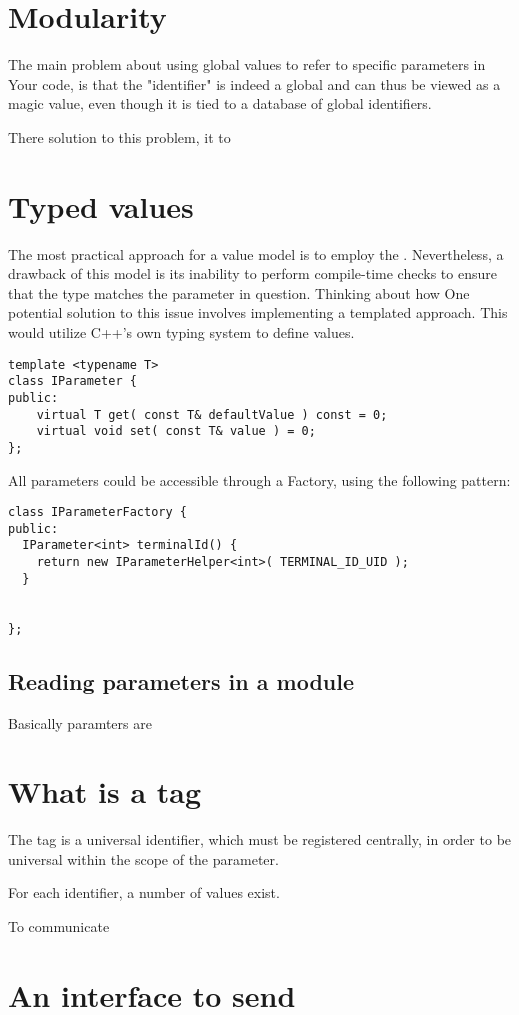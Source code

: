 \documentclass[a4paper,12pt]{article}
\begin{document}
\section{Modularity}
The main problem about using global values to refer to specific parameters in Your code, is that the "identifier" is indeed a global
and can thus be viewed as a magic value, even though it is tied to a database of global identifiers.

There solution to this problem, it to 

\section{Typed values}

The most practical approach for a value model is to employ the . 
Nevertheless, a drawback of this model is its inability to perform compile-time checks to ensure that the type matches the parameter in question. 
Thinking about how
One potential solution to this issue involves implementing a templated approach. This would utilize C++'s own typing system to define values. 

\begin{verbatim}
template <typename T>
class IParameter {
public:
    virtual T get( const T& defaultValue ) const = 0;
    virtual void set( const T& value ) = 0;
};
\end{verbatim}

All parameters could be accessible through a Factory, using the following pattern:

\begin{verbatim}
class IParameterFactory {
public:
  IParameter<int> terminalId() {
    return new IParameterHelper<int>( TERMINAL_ID_UID );
  }

  
};
\end{verbatim}


\subsection{Reading parameters in a module}
Basically paramters are 


\section{What is a tag}

The tag is a universal identifier, which must be registered centrally, in order to be universal within the scope of the parameter.  

For each identifier, a number of values exist.

To communicate 

\section{An interface to send}
\end{document}
